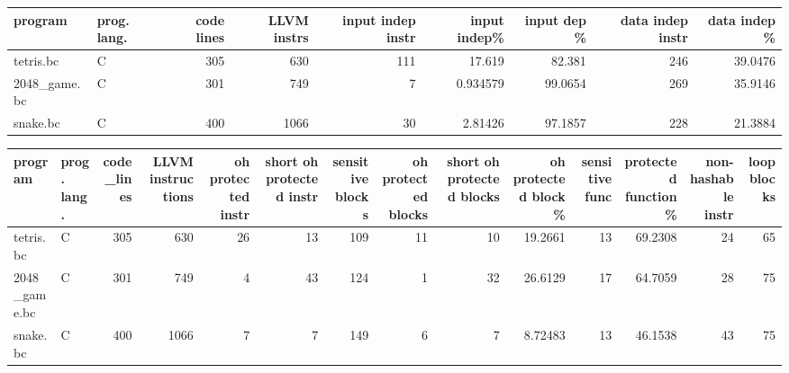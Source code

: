 \documentclass{article}
\begin{document}
\begin{table}[ht]
\centering
\begin{adjustbox}{width=1.3\textwidth}
\begin{tabular}{llrrrrrrr}
\hline
 program      & prog. lang.   &   code lines &   LLVM instrs &   input indep instr &   input indep\% &   input dep \% &   data indep instr &   data indep \% \\
\hline
 tetris.bc    & C             &          305 &           630 &                 111 &      17.619    &       82.381  &                246 &        39.0476 \\
 2048\_game.bc & C             &          301 &           749 &                   7 &       0.934579 &       99.0654 &                269 &        35.9146 \\
 snake.bc     & C             &          400 &          1066 &                  30 &       2.81426  &       97.1857 &                228 &        21.3884 \\
\hline
\end{tabular}
\end{adjustbox}
\end{table}

\begin{table}[ht]
\centering
\begin{adjustbox}{width=1.3\textwidth}
\begin{tabular}{llrrrrrrrrrrrr}
\hline
 program      & prog. lang.   &   code\_lines &   LLVM instructions &   oh protected instr &   short oh protected instr &   sensitive blocks &   oh protected blocks &   short oh protected blocks &   oh protected block \% &   sensitive func &   protected function \% &   non-hashable instr &   loop blocks \\
\hline
 tetris.bc    & C             &          305 &                 630 &                   26 &                         13 &                109 &                    11 &                          10 &               19.2661  &               13 &                69.2308 &                   24 &            65 \\
 2048\_game.bc & C             &          301 &                 749 &                    4 &                         43 &                124 &                     1 &                          32 &               26.6129  &               17 &                64.7059 &                   28 &            75 \\
 snake.bc     & C             &          400 &                1066 &                    7 &                          7 &                149 &                     6 &                           7 &                8.72483 &               13 &                46.1538 &                   43 &            75 \\
\hline
\end{tabular}
\end{adjustbox}
\end{table}
\end{document}
